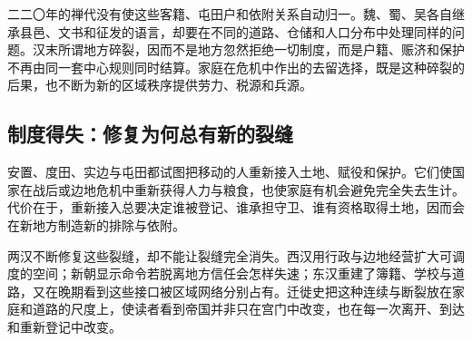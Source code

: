 二二〇年的禅代没有使这些客籍、屯田户和依附关系自动归一。魏、蜀、吴各自继承县邑、文书和征发的语言，却要在不同的道路、仓储和人口分布中处理同样的问题。汉末所谓地方碎裂，因而不是地方忽然拒绝一切制度，而是户籍、赈济和保护不再由同一套中心规则同时结算。家庭在危机中作出的去留选择，既是这种碎裂的后果，也不断为新的区域秩序提供劳力、税源和兵源。
\subsection{制度得失：修复为何总有新的裂缝}

安置、度田、实边与屯田都试图把移动的人重新接入土地、赋役和保护。它们使国家在战后或边地危机中重新获得人力与粮食，也使家庭有机会避免完全失去生计。代价在于，重新接入总要决定谁被登记、谁承担守卫、谁有资格取得土地，因而会在新地方制造新的排除与依附。

两汉不断修复这些裂缝，却不能让裂缝完全消失。西汉用行政与边地经营扩大可调度的空间；新朝显示命令若脱离地方信任会怎样失速；东汉重建了簿籍、学校与道路，又在晚期看到这些接口被区域网络分别占有。迁徙史把这种连续与断裂放在家庭和道路的尺度上，使读者看到帝国并非只在宫门中改变，也在每一次离开、到达和重新登记中改变。
